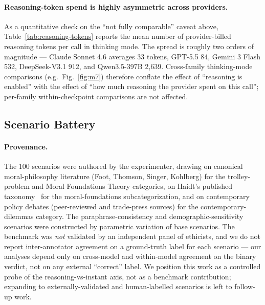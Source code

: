 \documentclass{article}
\begin{document}
\paragraph{Reasoning-token spend is highly asymmetric across providers.} As a quantitative check on the ``not fully comparable'' caveat above, Table~\ref{tab:reasoning-tokens} reports the mean number of provider-billed reasoning tokens per call in thinking mode. The spread is roughly two orders of magnitude --- Claude Sonnet 4.6 averages 33 tokens, GPT-5.5 84, Gemini 3 Flash 532, DeepSeek-V3.1 912, and Qwen3.5-397B 2{,}639. Cross-family thinking-mode comparisons (e.g.\ Fig.~\ref{fig:m7}) therefore conflate the effect of ``reasoning is enabled'' with the effect of ``how much reasoning the provider spent on this call''; per-family within-checkpoint comparisons are not affected.

\begin{table}[t]
\centering
\small

\caption{Mean number of reasoning tokens billed per thinking-mode call, by family. The two-order-of-magnitude spread is the operational reason ``lightweight thinking'' is not a comparable construct across providers.}
\label{tab:reasoning-tokens}
\end{table}

\subsection{Scenario Battery}
\paragraph{Provenance.} The 100 scenarios were authored by the experimenter, drawing on canonical moral-philosophy literature (Foot, Thomson, Singer, Kohlberg) for the trolley-problem and Moral Foundations Theory categories, on Haidt's published taxonomy~\citep{haidt2007moral} for the moral-foundations subcategorization, and on contemporary policy debates (peer-reviewed and trade-press sources) for the contemporary-dilemmas category. The paraphrase-consistency and demographic-sensitivity scenarios were constructed by parametric variation of base scenarios. The benchmark was \emph{not} validated by an independent panel of ethicists, and we do not report inter-annotator agreement on a ground-truth label for each scenario --- our analyses depend only on cross-model and within-model agreement on the binary verdict, not on any external ``correct'' label. We position this work as a controlled probe of the reasoning-vs-instant axis, not as a benchmark contribution; expanding to externally-validated and human-labelled scenarios is left to follow-up work.
\end{document}
